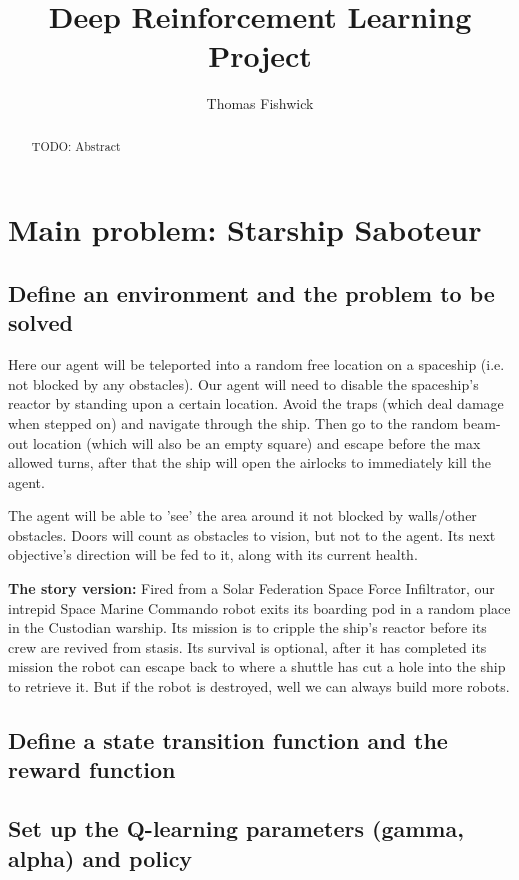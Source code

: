 \documentclass[a4pape, 11pt, english]{article}
\begin{document}
\title{Deep Reinforcement Learning Project}
\author{Thomas Fishwick}

\maketitle

\begin{abstract}
TODO: Abstract
\end{abstract}

\section{Main problem: Starship Saboteur}
\subsection{Define an environment and the problem to be solved}
Here our agent will be teleported into a random free location on a spaceship (i.e. not blocked by any obstacles). Our agent will need to disable the spaceship's reactor by standing upon a certain location. Avoid the traps (which deal damage when stepped on) and navigate through the ship. Then go to the random beam-out location (which will also be an empty square) and escape before the max allowed turns, after that the ship will open the airlocks to immediately kill the agent.

The agent will be able to 'see' the area around it not blocked by walls/other obstacles. Doors will count as obstacles to vision, but not to the agent. Its next objective's direction will be fed to it, along with its current health.

\textbf{The story version:}
Fired from a Solar Federation Space Force Infiltrator, our intrepid Space Marine Commando robot exits its boarding pod in a random place in the Custodian warship. Its mission is to cripple the ship's reactor before its crew are revived from stasis. Its survival is optional, after it has completed its mission the robot can escape back to where a shuttle has cut a hole into the ship to retrieve it. But if the robot is destroyed, well we can always build more robots.

\subsection{Define a state transition function and the reward function}

\subsection{Set up the Q-learning parameters (gamma, alpha) and policy}
\end{document}
